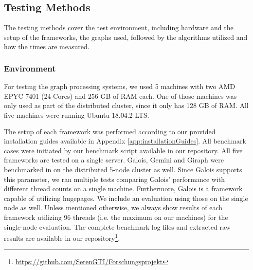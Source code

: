 

\subsection{Testing Methods}
The testing methods cover the test environment, including hardware and the setup of the frameworks, the graphs used, followed by the algorithms utilized and how the times are measured. 

\subsubsection{Environment}
For testing the graph processing systems, we used 5 machines with two AMD EPYC 7401 (24-Cores) and 256 GB of RAM each. One of those machines was only used as part of the distributed cluster, since it only has 128 GB of RAM.
All five machines were running Ubuntu 18.04.2 LTS.

The setup of each framework was performed according to our provided installation guides available in Appendix \ref{app:installationGuides}.
All benchmark cases were initiated by our benchmark script available in our repository.
All five frameworks are tested on a single server.
Galois, Gemini and Giraph were benchmarked in on the distributed 5-node cluster as well.
Since Galois supports this parameter, we ran multiple tests comparing Galois' performance with different thread counts on a single machine.
Furthermore, Galois is a framework capable of utilizing hugepages. We include an evaluation using those on the single node as well.
Unless mentioned otherwise, we always show results of each framework utilizing 96 threads (i.e. the maximum on our machines) for the single-node evaluation.
The complete benchmark log files and extracted raw results are available in our repository\footnote{\url{https://github.com/SerenGTI/Forschungsprojekt}}.


